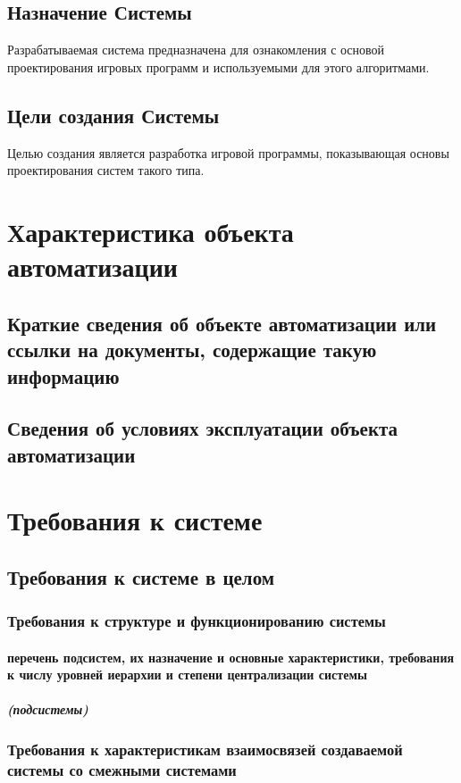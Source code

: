 \section{Назначение Системы}
Разрабатываемая система предназначена для ознакомления с основой проектирования игровых программ и 
используемыми для этого алгоритмами.

\section{Цели создания Системы}
Целью создания является разработка игровой программы, показывающая основы проектирования систем 
такого типа.

\chapter{Характеристика объекта автоматизации}
\section{Краткие сведения об объекте автоматизации или ссылки на документы, содержащие такую 
    информацию}
\section{Сведения об условиях эксплуатации объекта автоматизации}

\chapter{Требования к системе}
\section{Требования к системе в целом}
\subsection{Требования к структуре и функционированию системы}
\subsubsection{перечень подсистем, их назначение и основные характеристики, требования к числу 
    уровней иерархии и степени централизации системы}
\paragraph{(подсистемы)}
\subsection{Требования к характеристикам взаимосвязей создаваемой системы со смежными системами}
